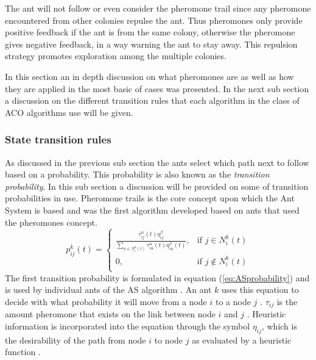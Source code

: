 The ant will not follow or even consider the pheromone trail since any pheromone encountered from other colonies repulse the ant\cite{ACOLargeProblem}. Thus pheromones only provide positive feedback if the ant is from the same colony, otherwise the pheromone gives negative feedback, in a way warning the ant to stay away\cite{ACOLargeProblem}. This repulsion strategy promotes exploration among the multiple colonies\cite{ACOLargeProblem}.

In this section an in depth discussion on what pheromones are as well as how they are applied in the most basic of cases was presented. In the next sub section a discussion on the different transition rules that each algorithm in the class of ACO algorithms use will be given.
\subsubsection{State transition rules}
 As discussed in the previous sub section the ants select which path next to follow based on a probability. This probability is also known as the \emph{transition probability}. In this sub section a discussion will be provided on some of transition probabilities in use. Pheromone trails is the core concept upon which the Ant System is based and was the first algorithm developed based on ants that used the pheromones concept\cite{CompuIntelligenceIntro,ACOLargeProblem,AntQAP,FundamentalSwarm}. 
\begin{equation}
\label{eq:ASprobability}
p^k_{ij}(t) =
\begin{cases}
	\frac{\tau^{\alpha}_{ij}(t)\eta^{\beta}_{ij}}{\sum_{u \in N^k_i(t)} {\tau^{\alpha}_{iu}(t)\eta^{\beta}_{iu}(t)}}, &\text{if $j \in N^k_i(t)$}\\
	0, &\text{if $j \notin N^k_i(t)$}\\
\end{cases}
\end{equation}
The first transition probability is formulated in equation (\ref{eq:ASprobability}) and is used by individual ants of the AS algorithm \cite{CompuIntelligenceIntro,AntSurvey,ACOLargeProblem,AntQAP,FundamentalSwarm}. An ant $k$ uses this equation to decide with what probability it will move from a node $i$ to a node $j$ \cite{CompuIntelligenceIntro,ACOLargeProblem,AntQAP,FundamentalSwarm}. $\tau_{ij}$ is the amount pheromone that exists on the link between node $i$ and $j$ \cite{CompuIntelligenceIntro,AntsAndStigmergy,ACOLargeProblem,AntQAP,FundamentalSwarm}. Heuristic information is incorporated into the equation through the symbol $\eta_{ij}$, which is the desirability of the path from node $i$ to node $j$ as evaluated by a heuristic function \cite{CompuIntelligenceIntro,AntsAndStigmergy,ACOLargeProblem,AntQAP,FundamentalSwarm}. 


